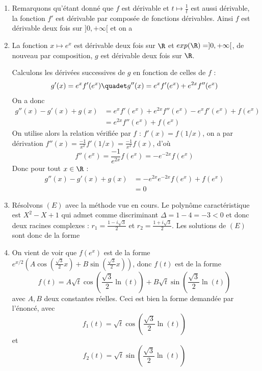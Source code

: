 \begin{correction}
\begin{enumerate}
\item Remarquons qu'étant donné que $f$ est dérivable et $t\mapsto \frac{1}{t}$ est aussi dérivable, la fonction $f'$ est dérivable par composée de fonctions dérivables. Ainsi $f$ est dérivable deux fois sur $]0,+\infty[$ et on a 

\item La fonction $x\mapsto e^x$ est dérivable deux fois sur $\R$ et $exp(\R) = ]0,+\infty[$, de nouveau par composition, $g$ est dérivable deux fois sur $\R$. 

Calculons les dérivées successives de $g$ en fonction de celles de $f$ :
$$g'(x) = e^x f'(e^x) \quadet g''(x) = e^xf'(e^x) +e^{2x} f''(e^x)$$
On  a donc 
\begin{align*}
g''(x)-g'(x)+g(x)  &= e^xf'(e^x) +e^{2x} f''(e^x)-e^x f'(e^x)+f(e^{x})\\
						&= e^{2x} f''(e^x)+f(e^{x})
\end{align*}
On utilise alors la relation vérifiée par $f$ : $f'(x) = f(1/x)$, on a par dérivation $f''(x) = \frac{-1}{x^2}f'(1/x)  = \frac{-1}{x^2}f(x)$, d'où 
$$f''(e^x) = \frac{-1}{e^{2x}}f(e^{x})=-e^{-2x} f(e^x)$$
Donc pour tout $x\in \R$ :
\begin{align*}
g''(x)-g'(x)+g(x)  &=  -e^{2x}e^{-2x} f(e^x) +f(e^x)\\
							&=0
\end{align*}

\item Résolvons $(E)$ avec la méthode vue en cours. Le polynôme caractéristique est 
$X^2-X+1$ qui admet comme discriminant $\Delta = 1-4 =-3<0$ et donc deux racines complexes : $r_1=\frac{1-i\sqrt{3}}{2}$ et $r_2=\frac{1+i\sqrt{3}}{2}$. 
Les solutions de $(E)$ sont donc de la forme 

\item On vient de voir que $f(e^{x})$ est de la forme $e^{x/2} (A\cos\left(\frac{\sqrt{3}}{2}x\right)+B\sin\left(\frac{\sqrt{3}}{2}x\right)) $, donc 
$f(t) $ est de la forme 
$$f(t) = A \sqrt{t}  \cos\left(\frac{\sqrt{3}}{2}\ln(t)\right) +B\sqrt{t}  \sin\left(\frac{\sqrt{3}}{2}\ln(t)\right)$$
avec $A,B$ deux constantes réelles. Ceci est bien la forme demandée par l'énoncé, avec 
$$f_1(t) = \sqrt{t}  \cos\left(\frac{\sqrt{3}}{2}\ln(t)\right)$$ et 
$$f_2(t) = \sqrt{t}  \sin\left(\frac{\sqrt{3}}{2}\ln(t)\right)$$


\end{enumerate}
\end{correction}

